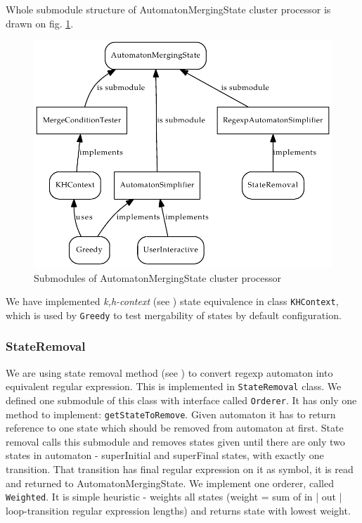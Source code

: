 \documentclass[a4paper,10pt,oneside]{article}
\newcommand{\myscale}{0.74}
\newcommand{\code}[1]{\texttt{#1}}
\begin{document}
Whole submodule structure of AutomatonMergingState cluster processor is drawn on fig. \ref{automaton_merging_state_submodules}.
\begin{figure}
	\centering\includegraphics[scale=\myscale]{automaton_merging_state_submodules}
	\caption{Submodules of AutomatonMergingState cluster processor} \label{automaton_merging_state_submodules}
\end{figure}
We have implemented \emph{k,h-context} (see \cite{ahonen}) state equivalence in class \code{KHContext}, which is used by \code{Greedy}
to test mergability of states by default configuration.

\subsubsection{StateRemoval}
We are using state removal method (see \cite{1224321}) to convert regexp automaton into equivalent regular expression.
This is implemented in \code{StateRemoval} class.
We defined one submodule of this class with interface called \code{Orderer}.
It has only one method to implement: \code{getStateToRemove}.
Given automaton it has to return reference to one state which should be removed from automaton at first.
State removal calls this submodule and removes states given until there are only two states in automaton - superInitial and superFinal states,
with exactly one transition.
That transition has final regular expression on it as symbol, it is read and returned to AutomatonMergingState.
We implement one orderer, called \code{Weighted}.
It is simple heuristic - weights all states (weight = sum of {in | out | loop}-transition regular expression lengths) and returns state with lowest weight.
\end{document}
